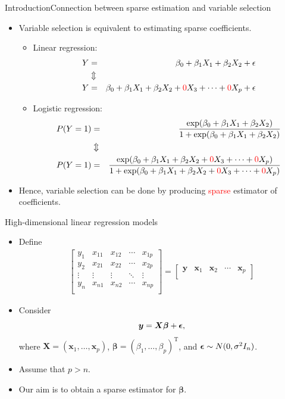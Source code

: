 \documentclass[citecolor=blue,10pt]{beamer}
\def\T{{ \mathrm{\scriptscriptstyle T} }}
\newcommand{\0} {\mbox{\boldmath$0$}}
\newcommand{\uy}{{\boldsymbol y}}
\newcommand{\ux}{{\boldsymbol x}}
\newcommand{\uX}{{\boldsymbol X}}
\newcommand{\ubeta}{{\boldsymbol \beta}}
\newcommand{\uepsilon} {\mbox{\boldmath $\epsilon$}}
\begin{document}
\begin{frame}{Introduction}{Connection between sparse estimation and variable selection}
\begin{itemize}
\item Variable selection is equivalent to estimating sparse coefficients.
\begin{itemize}
\item Linear regression:
{\footnotesize
\begin{eqnarray*}
Y&=&\beta_0+\beta_1 X_1+\beta_2 X_2 +\epsilon\\
&\Updownarrow&\\
 Y&=&\beta_0+\beta_1 X_1+\beta_2 X_2+\textcolor{red}{0} X_3+\cdots + \textcolor{red}{0} X_p +\epsilon
\end{eqnarray*}}
\item Logistic regression:
{\footnotesize
\begin{eqnarray*}
P(Y=1)&=&\frac{\exp(\beta_0+\beta_1 X_1+\beta_2 X_2)}{1+\exp(\beta_0+\beta_1 X_1+\beta_2 X_2)} \\
&\Updownarrow&\\
P(Y=1)&=&\frac{\exp(\beta_0+\beta_1 X_1+\beta_2 X_2+\textcolor{red}{0} X_3+\cdots + \textcolor{red}{0} X_p)}{1+\exp(\beta_0+\beta_1 X_1+\beta_2 X_2+\textcolor{red}{0} X_3+\cdots + \textcolor{red}{0} X_p)} 
\end{eqnarray*}}

\end{itemize}
\item Hence, variable selection can be done by producing \textcolor{red}{sparse} estimator of coefficients.
\end{itemize}

\end{frame}
\begin{frame}{High-dimensional linear regression models}
\begin{itemize}\itemsep=5mm
\item Define
\begin{eqnarray*}
\left[\begin{array}{c|cccc}
y_1& x_{11} & x_{12}&\cdots & x_{1p}  \\
y_2& x_{21} & x_{22}&\cdots & x_{2p} \\
\vdots& \vdots & \vdots&\ddots & \vdots \\
y_n& x_{n1} & x_{n2}&\cdots & x_{np} \\
\end{array}\right]=\left[\begin{array}{c|cccc}
\uy& \ux_{1} & \ux_{2}&\cdots & \ux_{p}  \\
\end{array}\right]
\end{eqnarray*}
\item Consider 
$$ \uy=\uX\ubeta +\uepsilon,$$
where $\uX=(\ux_1,\ldots,\ux_p)$, $\ubeta=(\beta_1,\ldots, \beta_p)^\T$, and $\uepsilon \sim N(0,\sigma^2 I_n)$.
 \item Assume that $p>n$.
 \item Our aim is to obtain a sparse estimator for $\ubeta$.
\end{itemize}
\end{frame}
\end{document}
